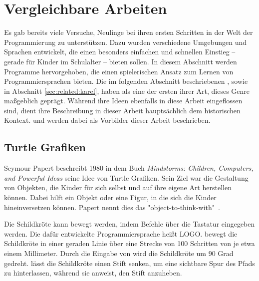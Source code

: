 \chapter{Vergleichbare Arbeiten}
\label{sec:related}

Es gab bereits viele Versuche, Neulinge bei ihren ersten Schritten in der Welt der Programmierung zu unterstützen. Dazu wurden verschiedene Umgebungen und Sprachen entwickelt, die einen besonders einfachen und schnellen Einstieg -- gerade für Kinder im Schulalter -- bieten sollen. In diesem Abschnitt werden Programme hervorgehoben, die einen spielerischen Ansatz zum Lernen von Programmiersprachen bieten. Die im folgenden Abschnitt beschriebenen , sowie  in Abschnitt \ref{sec:related:karel}, haben als eine der ersten ihrer Art, dieses Genre maßgeblich geprägt. Während ihre Ideen ebenfalls in diese Arbeit eingeflossen sind, dient ihre Beschreibung in dieser Arbeit hauptsächlich dem historischen Kontext.  und  werden dabei als Vorbilder dieser Arbeit beschrieben.

\section{Turtle Grafiken}
\label{sec:related:turtle}

Seymour Papert beschreibt 1980 in dem Buch \textit{Mindstorms: Children, Computers, and Powerful Ideas} seine Idee von Turtle Grafiken. Sein Ziel war die Gestaltung von Objekten, die Kinder für sich selbst und auf ihre eigene Art herstellen können. Dabei hilft ein Objekt oder eine Figur, in die sich die Kinder hineinversetzen können. Papert nennt dies das "object-to-think-with"~\cite[11]{papert1980}.

Die Schildkröte kann bewegt werden, indem Befehle über die Tastatur eingegeben werden. Die dafür entwickelte Programmiersprache heißt LOGO.  bewegt die Schildkröte in einer geraden Linie über eine Strecke von 100 Schritten von je etwa einem Millimeter. Durch die Eingabe von  wird die Schildkröte um 90 Grad gedreht.  lässt die Schildkröte einen Stift senken, um eine sichtbare Spur des Pfads zu hinterlassen, während  sie anweist, den Stift anzuheben.

